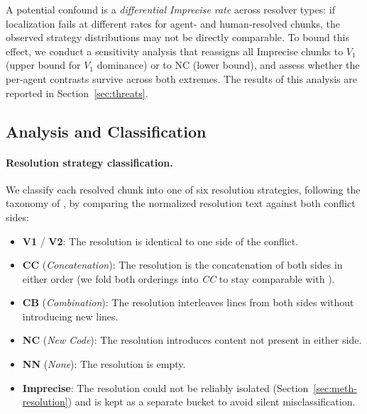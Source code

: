\documentclass[sigconf,anonymous]{acmart}
\begin{document}
A potential confound is a \emph{differential Imprecise rate} across resolver types: if localization fails at different rates for agent- and human-resolved chunks, the observed strategy distributions may not be directly comparable. To bound this effect, we conduct a sensitivity analysis that reassigns all Imprecise chunks to $V_1$ (upper bound for $V_1$ dominance) or to NC (lower bound), and assess whether the per-agent contrasts survive across both extremes. The results of this analysis are reported in Section~\ref{sec:threats}.

\subsection{Analysis and Classification}
\label{sec:meth-analysis}

\paragraph{Resolution strategy classification.}
\label{sec:meth-strategies}
We classify each resolved chunk into one of six resolution strategies, following the taxonomy of \citet{ghiotto2020nature}, by comparing the normalized resolution text against both conflict sides:

\begin{itemize}
    \item \textbf{V1} / \textbf{V2}: The resolution is identical to one side of the conflict.
    \item \textbf{CC} (\emph{Concatenation}): The resolution is the concatenation of both sides in either order (we fold both orderings into \textit{CC} to stay comparable with \citet{ghiotto2020nature}).
    \item \textbf{CB} (\emph{Combination}): The resolution interleaves lines from both sides without introducing new lines.
    \item \textbf{NC} (\emph{New Code}): The resolution introduces content not present in either side.
    \item \textbf{NN} (\emph{None}): The resolution is empty.
    \item \textbf{Imprecise}: The resolution could not be reliably isolated (Section~\ref{sec:meth-resolution}) and is kept as a separate bucket to avoid silent misclassification.
\end{itemize}
\end{document}
